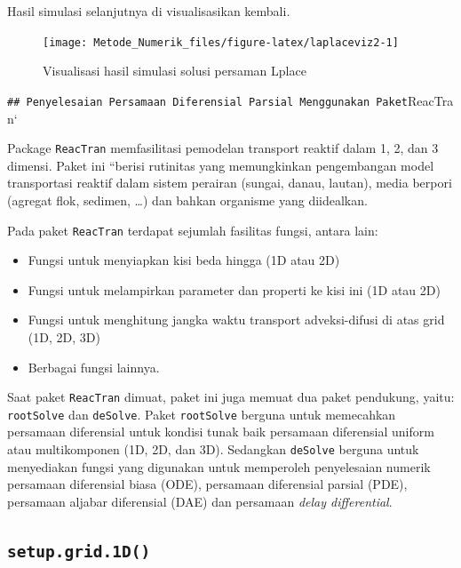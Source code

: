 \documentclass[
]{book}
\providecommand{\tightlist}{%
  \setlength{\itemsep}{0pt}\setlength{\parskip}{0pt}}
\theoremstyle{definition}
\theoremstyle{definition}
\theoremstyle{definition}
\theoremstyle{definition}
\theoremstyle{remark}
\begin{document}
Hasil simulasi selanjutnya di visualisasikan kembali.

\begin{figure}

{\centering \texttt{[image: Metode\_Numerik\_files/figure-latex/laplaceviz2-1]} 

}

\caption{Visualisasi hasil simulasi solusi persaman Lplace}\label{fig:laplaceviz2}
\end{figure}

\texttt{\#\#\ Penyelesaian\ Persamaan\ Diferensial\ Parsial\ Menggunakan\ Paket}ReacTran`

Package \texttt{ReacTran} memfasilitasi pemodelan transport reaktif dalam 1, 2, dan 3 dimensi. Paket ini ``berisi rutinitas yang memungkinkan pengembangan model transportasi reaktif dalam sistem perairan (sungai, danau, lautan), media berpori (agregat flok, sedimen, \ldots) dan bahkan organisme yang diidealkan.

Pada paket \texttt{ReacTran} terdapat sejumlah fasilitas fungsi, antara lain:

\begin{itemize}
\tightlist
\item
  Fungsi untuk menyiapkan kisi beda hingga (1D atau 2D)
\item
  Fungsi untuk melampirkan parameter dan properti ke kisi ini (1D atau 2D)
\item
  Fungsi untuk menghitung jangka waktu transport adveksi-difusi di atas grid (1D, 2D, 3D)
\item
  Berbagai fungsi lainnya.
\end{itemize}

Saat paket \texttt{ReacTran} dimuat, paket ini juga memuat dua paket pendukung, yaitu: \texttt{rootSolve} dan \texttt{deSolve}. Paket \texttt{rootSolve} berguna untuk memecahkan persamaan diferensial untuk kondisi tunak baik persamaan diferensial uniform atau multikomponen (1D, 2D, dan 3D). Sedangkan \texttt{deSolve} berguna untuk menyediakan fungsi yang digunakan untuk memperoleh penyelesaian numerik persamaan diferensial biasa (ODE), persamaan diferensial parsial (PDE), persamaan aljabar diferensial (DAE) dan persamaan \emph{delay differential}.

\hypertarget{setup.grid.1d}{%
\subsection{\texorpdfstring{\texttt{setup.grid.1D()}}{setup.grid.1D()}}\label{setup.grid.1d}}
\end{document}
